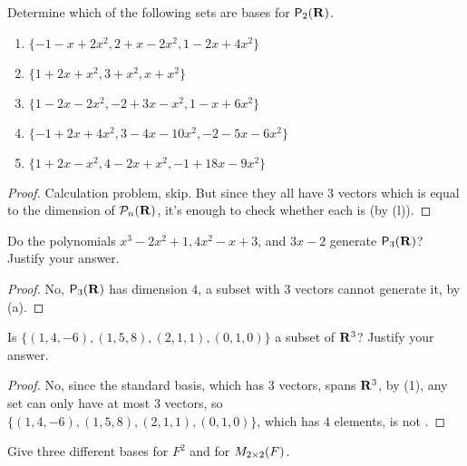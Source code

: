 \begin{exercise} \label{exercise 1.6.3}
Determine which of the following sets are bases for \(\textsf{P}_2(\mathbf{R})\).
\begin{enumerate}
\item \(\{ -1 - x + 2x^2, 2 + x - 2x^2, 1 - 2x + 4x^2 \}\)
\item \(\{ 1 + 2x + x^2, 3 + x^2, x + x^2 \}\)
\item \(\{ 1 - 2x -2x^2, -2 + 3x - x^2, 1 - x + 6x^2 \}\)
\item \(\{ -1 + 2x + 4x^2, 3 - 4x - 10x^2, -2 - 5x - 6x^2 \}\)
\item \(\{ 1 + 2x - x^2, 4 - 2x + x^2, -1 + 18x - 9x^2 \}\)
\end{enumerate}
\end{exercise}

\begin{proof}
Calculation problem, skip.
But since they all have \(3\) vectors which is equal to the dimension of \(\mathcal{P}_n(\mathbf{R})\), it's enough to check whether each is \LID{} (by (l)).
\end{proof}

\begin{exercise} \label{exercise 1.6.4}
Do the polynomials \(x^3 - 2x^2 + 1, 4x^2 - x + 3\), and \(3x - 2\) generate \(\textsf{P}_3(\mathbf{R})\)?
Justify your answer.
\end{exercise}

\begin{proof}
No, \(\textsf{P}_3(\mathbf{R})\) has dimension \(4\), a subset with \(3\) vectors cannot generate it, by (a).
\end{proof}

\begin{exercise} \label{exercise 1.6.5}
Is \(\{ (1, 4, -6), (1, 5, 8), (2, 1, 1), (0, 1,0) \}\) a \LID{} subset of \(\mathbf{R}^3\)?
Justify your answer.
\end{exercise}

\begin{proof}
No, since the standard basis, which has \(3\) vectors, spans \(\mathbf{R}^3\), by (1), any \LID{} set can only have at most \(3\) vectors, so \(\{ (1, 4, -6), (1, 5, 8), (2, 1, 1), (0, 1,0) \}\), which has \(4\) elements, is not \LID{}.
\end{proof}

\begin{exercise} \label{exercise 1.6.6}
Give three different bases for \(F^2\) and for \(M_{2 \times 2}(F)\).
\end{exercise}

